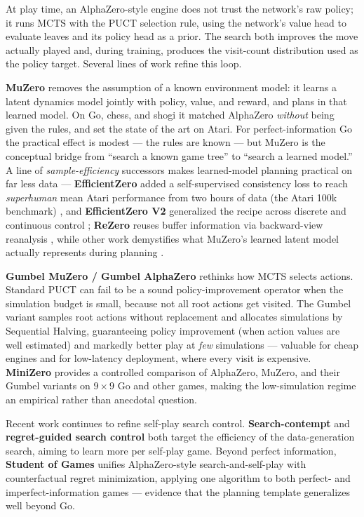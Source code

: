 \documentclass[11pt]{article}
\begin{document}
At play time, an AlphaZero-style engine does not trust the network's raw policy; it runs
MCTS with the PUCT selection rule, using the network's value head to evaluate leaves and
its policy head as a prior. The search both improves the move actually played and, during
training, produces the visit-count distribution used as the policy target. Several lines
of work refine this loop.

\textbf{MuZero} \cite{muzero2020} removes the assumption of a known environment model: it
learns a latent dynamics model jointly with policy, value, and reward, and plans in that
learned model. On Go, chess, and shogi it matched AlphaZero \emph{without} being given the
rules, and set the state of the art on Atari. For perfect-information Go the practical effect
is modest --- the rules are known --- but MuZero is the conceptual bridge from ``search a
known game tree'' to ``search a learned model.'' A line of \emph{sample-efficiency} successors makes
learned-model planning practical on far less data --- \textbf{EfficientZero} added a
self-supervised consistency loss to reach \emph{superhuman} mean Atari performance from two
hours of data (the Atari 100k benchmark) \cite{efficientzero2021}, and \textbf{EfficientZero
V2} generalized the recipe across
discrete and continuous control \cite{efficientzerov2}; \textbf{ReZero} reuses buffer
information via backward-view reanalysis \cite{rezero2024}, while other work demystifies
what MuZero's learned latent model actually represents during planning
\cite{demystifymuzero2024}.

\textbf{Gumbel MuZero / Gumbel AlphaZero} \cite{gumbel2022} rethinks how MCTS selects
actions. Standard PUCT can fail to be a sound policy-improvement operator when the
simulation budget is small, because not all root actions get visited. The Gumbel variant
samples root actions without replacement and allocates simulations by Sequential Halving,
guaranteeing policy improvement (when action values are well estimated) and markedly better
play at \emph{few} simulations ---
valuable for cheap engines and for low-latency deployment, where every visit is expensive.
\textbf{MiniZero} \cite{minizero2024} provides a controlled comparison of AlphaZero,
MuZero, and their Gumbel variants on $9\times9$ Go and other games, making the
low-simulation regime an empirical rather than anecdotal question.

Recent work continues to refine self-play search control. \textbf{Search-contempt}
\cite{searchcontempt2025} and \textbf{regret-guided search control}
\cite{regretsearch2026} both target the efficiency of the data-generation search, aiming
to learn more per self-play game. Beyond perfect information, \textbf{Student of Games}
\cite{studentofgames2022} unifies AlphaZero-style search-and-self-play with counterfactual
regret minimization, applying one algorithm to both perfect- and imperfect-information
games --- evidence that the planning template generalizes well beyond Go.
\end{document}
